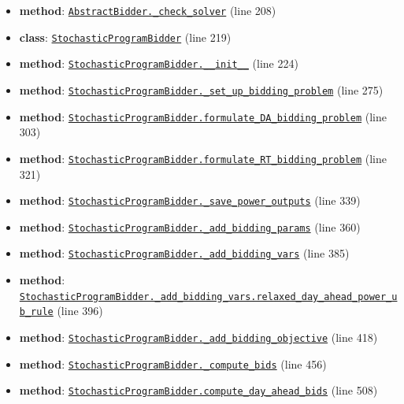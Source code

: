 \documentclass[11pt]{report}
\begin{document}
\begin{itemize}[leftmargin=*]
  \item \textbf{method}: \hyperref[def:bidder.py:AbstractBidder._check_solver:L208]{\texttt{AbstractBidder.\_check\_solver}} (line 208)
  \item \textbf{class}: \hyperref[def:bidder.py:StochasticProgramBidder:L219]{\texttt{StochasticProgramBidder}} (line 219)
  \item \textbf{method}: \hyperref[def:bidder.py:StochasticProgramBidder.__init__:L224]{\texttt{StochasticProgramBidder.\_\_init\_\_}} (line 224)
  \item \textbf{method}: \hyperref[def:bidder.py:StochasticProgramBidder._set_up_bidding_problem:L275]{\texttt{StochasticProgramBidder.\_set\_up\_bidding\_problem}} (line 275)
  \item \textbf{method}: \hyperref[def:bidder.py:StochasticProgramBidder.formulate_DA_bidding_problem:L303]{\texttt{StochasticProgramBidder.formulate\_DA\_bidding\_problem}} (line 303)
  \item \textbf{method}: \hyperref[def:bidder.py:StochasticProgramBidder.formulate_RT_bidding_problem:L321]{\texttt{StochasticProgramBidder.formulate\_RT\_bidding\_problem}} (line 321)
  \item \textbf{method}: \hyperref[def:bidder.py:StochasticProgramBidder._save_power_outputs:L339]{\texttt{StochasticProgramBidder.\_save\_power\_outputs}} (line 339)
  \item \textbf{method}: \hyperref[def:bidder.py:StochasticProgramBidder._add_bidding_params:L360]{\texttt{StochasticProgramBidder.\_add\_bidding\_params}} (line 360)
  \item \textbf{method}: \hyperref[def:bidder.py:StochasticProgramBidder._add_bidding_vars:L385]{\texttt{StochasticProgramBidder.\_add\_bidding\_vars}} (line 385)
  \item \textbf{method}: \hyperref[def:bidder.py:StochasticProgramBidder._add_bidding_vars.relaxed_day_ahead_power_ub_rule:L396]{\texttt{StochasticProgramBidder.\_add\_bidding\_vars.relaxed\_day\_ahead\_power\_ub\_rule}} (line 396)
  \item \textbf{method}: \hyperref[def:bidder.py:StochasticProgramBidder._add_bidding_objective:L418]{\texttt{StochasticProgramBidder.\_add\_bidding\_objective}} (line 418)
  \item \textbf{method}: \hyperref[def:bidder.py:StochasticProgramBidder._compute_bids:L456]{\texttt{StochasticProgramBidder.\_compute\_bids}} (line 456)
  \item \textbf{method}: \hyperref[def:bidder.py:StochasticProgramBidder.compute_day_ahead_bids:L508]{\texttt{StochasticProgramBidder.compute\_day\_ahead\_bids}} (line 508)

\end{itemize}
\end{document}
